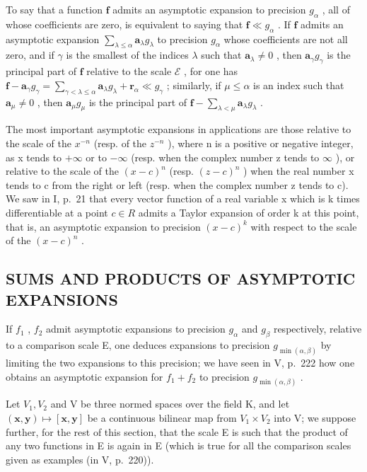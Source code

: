 To say that a function \(\mathbf{f}\) admits an asymptotic expansion to precision \(g_{\alpha}\) , all of whose coefficients are zero, is equivalent to saying that \(\mathbf{f} \ll g_{\alpha}\) . If \(\mathbf{f}\) admits an asymptotic expansion \(\sum_{\lambda \leqslant \alpha} \mathbf{a}_{\lambda} g_{\lambda}\) to precision \(g_{\alpha}\) whose coefficients are not all zero, and if \(\gamma\) is the smallest of the indices \(\lambda\) such that \(\mathbf{a}_{\lambda} \neq 0\) , then \(\mathbf{a}_{\gamma} g_{\gamma}\) is the principal part of \(\mathbf{f}\) relative to the scale \(\mathcal{E}\) , for one has \(\mathbf{f} - \mathbf{a}_{\gamma} g_{\gamma} = \sum_{\gamma < \lambda \leqslant \alpha} \mathbf{a}_{\lambda} g_{\lambda} + \mathbf{r}_{\alpha} \ll g_{\gamma}\) ; similarly, if \(\mu \leqslant \alpha\) is an index such that \(\mathbf{a}_{\mu} \neq 0\) , then \(\mathbf{a}_{\mu} g_{\mu}\) is the principal part of \(\mathbf{f} - \sum_{\lambda < \mu} \mathbf{a}_{\lambda} g_{\lambda}\) .

The most important asymptotic expansions in applications are those relative to the scale of the \(x^{-n}\) (resp. of the \(z^{-n}\) ), where n is a positive or negative integer, as x tends to \(+\infty\) or to \(-\infty\) (resp. when the complex number z tends to \(\infty\) ), or relative to the scale of the \((x - c)^{n}\) (resp. \((z - c)^{n}\) ) when the real number x tends to c from the right or left (resp. when the complex number z tends to c). We saw in I, p.~21 that every vector function of a real variable x which is k times differentiable at a point \(c \in R\) admits a Taylor expansion of order k at this point, that is, an asymptotic expansion to precision \((x - c)^{k}\) with respect to the scale of the \((x - c)^{n}\) .

\subsection{SUMS AND PRODUCTS OF ASYMPTOTIC EXPANSIONS}

If \(f_{1}\) , \(f_{2}\) admit asymptotic expansions to precision \(g_{\alpha}\) and \(g_{\beta}\) respectively, relative to a comparison scale E, one deduces expansions to precision \(g_{\min(\alpha,\beta)}\) by limiting the two expansions to this precision; we have seen in V, p.~222 how one obtains an asymptotic expansion for \(f_{1} + f_{2}\) to precision \(g_{\min(\alpha,\beta)}\) .

Let \(V_{1}, V_{2}\) and V be three normed spaces over the field K, and let \((\mathbf{x}, \mathbf{y}) \mapsto [\mathbf{x}, \mathbf{y}]\) be a continuous bilinear map from \(V_{1} \times V_{2}\) into V; we suppose further, for the rest of this section, that the scale E is such that the product of any two functions in E is again in E (which is true for all the comparison scales given as examples (in V, p.~220)).

